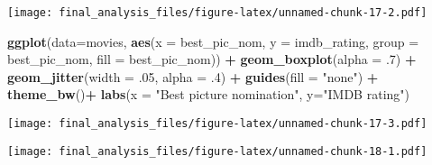 \documentclass[]{article}
\newenvironment{Shaded}{\begin{snugshade}}{\end{snugshade}}
\newcommand{\KeywordTok}[1]{\textcolor[rgb]{0.13,0.29,0.53}{\textbf{#1}}}
\newcommand{\DataTypeTok}[1]{\textcolor[rgb]{0.13,0.29,0.53}{#1}}
\newcommand{\DecValTok}[1]{\textcolor[rgb]{0.00,0.00,0.81}{#1}}
\newcommand{\StringTok}[1]{\textcolor[rgb]{0.31,0.60,0.02}{#1}}
\newcommand{\OperatorTok}[1]{\textcolor[rgb]{0.81,0.36,0.00}{\textbf{#1}}}
\newcommand{\NormalTok}[1]{#1}
\begin{document}
\texttt{[image: final\_analysis\_files/figure-latex/unnamed-chunk-17-2.pdf]}

\begin{Shaded}
\begin{Highlighting}[]
\KeywordTok{ggplot}\NormalTok{(}\DataTypeTok{data=}\NormalTok{movies, }\KeywordTok{aes}\NormalTok{(}\DataTypeTok{x =}\NormalTok{ best_pic_nom, }\DataTypeTok{y =}\NormalTok{ imdb_rating, }\DataTypeTok{group =}\NormalTok{ best_pic_nom, }\DataTypeTok{fill =}\NormalTok{ best_pic_nom)) }\OperatorTok{+}
\StringTok{  }\KeywordTok{geom_boxplot}\NormalTok{(}\DataTypeTok{alpha =}\NormalTok{ .}\DecValTok{7}\NormalTok{) }\OperatorTok{+}
\StringTok{  }\KeywordTok{geom_jitter}\NormalTok{(}\DataTypeTok{width =}\NormalTok{ .}\DecValTok{05}\NormalTok{, }\DataTypeTok{alpha =}\NormalTok{ .}\DecValTok{4}\NormalTok{) }\OperatorTok{+}
\StringTok{  }\KeywordTok{guides}\NormalTok{(}\DataTypeTok{fill =} \StringTok{"none"}\NormalTok{) }\OperatorTok{+}\StringTok{ }
\StringTok{  }\KeywordTok{theme_bw}\NormalTok{()}\OperatorTok{+}
\StringTok{  }\KeywordTok{labs}\NormalTok{(}\DataTypeTok{x =} \StringTok{"Best picture nomination"}\NormalTok{, }\DataTypeTok{y=}\StringTok{"IMDB rating"}\NormalTok{)}
\end{Highlighting}
\end{Shaded}

\texttt{[image: final\_analysis\_files/figure-latex/unnamed-chunk-17-3.pdf]}

\begin{Shaded}
\end{Shaded}

\texttt{[image: final\_analysis\_files/figure-latex/unnamed-chunk-18-1.pdf]}
\end{document}
